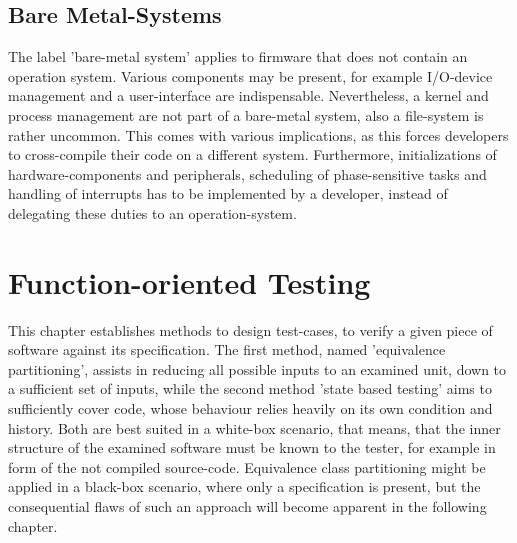 		
	\subsection{Bare Metal-Systems}
	The label 'bare-metal system' applies to firmware that does not contain an operation system. Various components may be present, for example I/O-device management and a user-interface are indispensable. Nevertheless, a kernel and process management are not part of a bare-metal system, also a file-system is rather uncommon. This comes with various implications, as this forces developers to cross-compile their code on a different system. Furthermore, initializations of hardware-components and peripherals, scheduling of phase-sensitive tasks and handling of interrupts has to be implemented by a developer, instead of delegating these duties to an operation-system.
	

	\section{Function-oriented Testing}

	This chapter establishes methods to design test-cases, to verify a given piece of software against its specification. The first method, named 'equivalence partitioning', assists in reducing all possible inputs to an examined unit, down to a sufficient set of inputs, while the second method 'state based testing' aims to sufficiently cover code, whose behaviour relies heavily on its own condition and history. Both are best suited in a white-box scenario, that means, that the inner structure of the examined software must be known to the tester, for example in form of the not compiled source-code. Equivalence class partitioning might be applied in a black-box scenario, where only a specification is present, but the consequential flaws of such an approach will become apparent in the following chapter.

